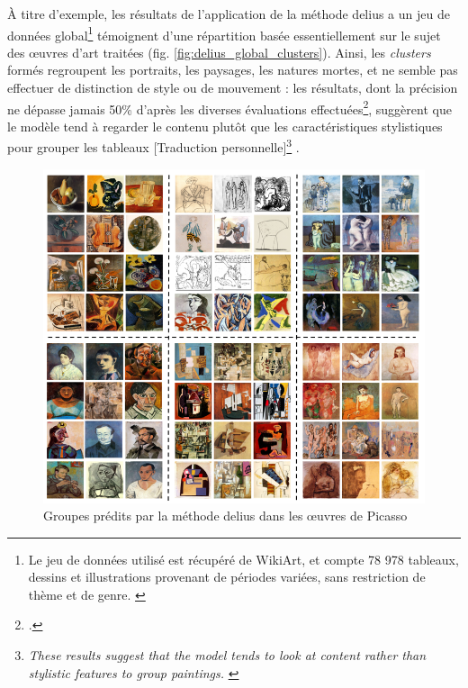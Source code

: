 	À titre d'exemple, les résultats de l'application de la méthode \acrshort{delius} a un jeu de données global\footnote{Le jeu de données utilisé est récupéré de WikiArt, et compte 78 978 tableaux, dessins et illustrations provenant de périodes variées, sans restriction de thème et de genre. \cite{ArtGANWikiArt}} témoignent d'une répartition basée essentiellement sur le sujet des œuvres d'art traitées (fig. \ref{fig:delius_global_clusters}). Ainsi, les \textit{clusters} formés regroupent les portraits, les paysages, les natures mortes, et ne semble pas effectuer de distinction de style ou de mouvement : les résultats, dont la précision ne dépasse jamais 50\% d'après les diverses évaluations effectuées\footcite{castellanoDeepLearningApproach2022}, \og suggèrent que le modèle tend à regarder le contenu plutôt que les caractéristiques stylistiques pour grouper les tableaux [Traduction personnelle]\footnote{\textit{\og These results suggest that the model tends to look at content rather than stylistic features to group paintings. \fg} \cite{castellanoDeepLearningApproach2022}} \fg.
	
	\begin{figure}[h]
		\centering
		\includegraphics[width=13cm]{images/delius_picasso_clusters.png}
		\caption{Groupes prédits par la méthode \acrshort{delius} dans les œuvres de Picasso}
		\label{fig:delius_picasso_clusters}
	\end{figure}

